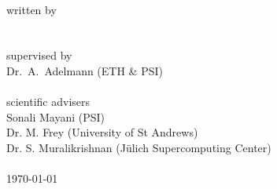 \documentclass[10pt]{report}
\begin{document}
\begin{titlepage}
{        \\ \small written by \\[5pt]
         \\
        \vspace{1cm} \\
        \small supervised by \\[5pt]
        Dr.\ A.\ Adelmann (ETH \& PSI)\\
        \vspace{0.5cm} \\
        \small scientific advisers \\[5pt]
        Sonali Mayani (PSI)\\
        Dr. M. Frey (University of St Andrews)\\
        Dr. S. Muralikrishnan (Jülich Supercomputing Center)\\
        \vspace{1.5cm} \\
        \today
    }
    \date{}
    \maketitle
    \thispagestyle{empty}
\end{titlepage}

\setcounter{page}{0}  %




\newpage
{}
\tableofcontents



\listoffigures
\end{document}
